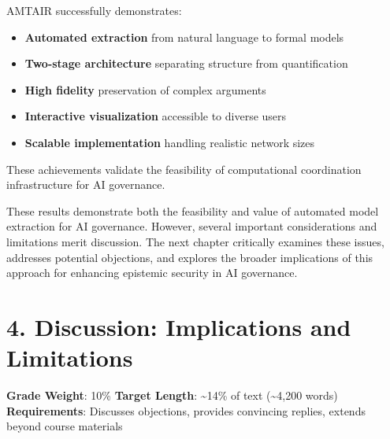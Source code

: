 \documentclass[
  11pt,
  letterpaper,
]{book}
\providecommand{\tightlist}{%
  \setlength{\itemsep}{0pt}\setlength{\parskip}{0pt}}
\begin{document}

AMTAIR successfully demonstrates:

\begin{itemize}
\tightlist
\item
  \textbf{Automated extraction} from natural language to formal models
\item
  \textbf{Two-stage architecture} separating structure from
  quantification
\item
  \textbf{High fidelity} preservation of complex arguments
\item
  \textbf{Interactive visualization} accessible to diverse users
\item
  \textbf{Scalable implementation} handling realistic network sizes
\end{itemize}

These achievements validate the feasibility of computational
coordination infrastructure for AI governance.

These results demonstrate both the feasibility and value of automated
model extraction for AI governance. However, several important
considerations and limitations merit discussion. The next chapter
critically examines these issues, addresses potential objections, and
explores the broader implications of this approach for enhancing
epistemic security in AI governance.


\chapter*{4. Discussion: Implications and
Limitations}\label{sec-discussion}


\begin{tcolorbox}[enhanced jigsaw, toprule=.15mm, colbacktitle=quarto-callout-note-color!10!white, opacitybacktitle=0.6, leftrule=.75mm, coltitle=black, rightrule=.15mm, opacityback=0, bottomtitle=1mm, title=\textcolor{quarto-callout-note-color}{\faInfo}\hspace{0.5em}{Chapter Overview}, toptitle=1mm, breakable, titlerule=0mm, left=2mm, arc=.35mm, colframe=quarto-callout-note-color-frame, bottomrule=.15mm, colback=white]

\textbf{Grade Weight}: 10\% \textbar{} \textbf{Target Length}:
\textasciitilde14\% of text (\textasciitilde4,200 words)\\
\textbf{Requirements}: Discusses objections, provides convincing
replies, extends beyond course materials

\end{tcolorbox}
\end{document}
